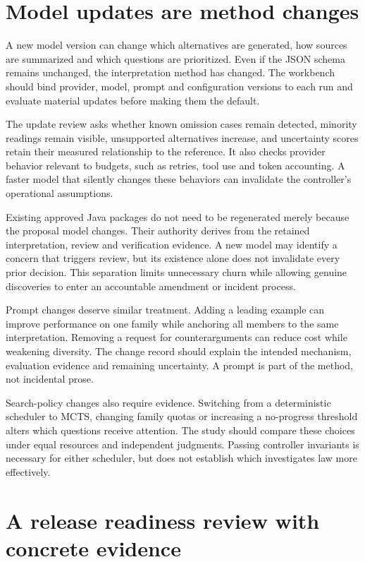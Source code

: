 \documentclass[12pt,a4paper,oneside,openany]{book}
\begin{document}
\section{Model updates are method changes}

A new model version can change which alternatives are generated, how sources are
summarized and which questions are prioritized. Even if the JSON schema remains
unchanged, the interpretation method has changed. The workbench should bind
provider, model, prompt and configuration versions to each run and evaluate
material updates before making them the default.

The update review asks whether known omission cases remain detected, minority
readings remain visible, unsupported alternatives increase, and uncertainty scores
retain their measured relationship to the reference. It also checks provider
behavior relevant to budgets, such as retries, tool use and token accounting.
A faster model that silently changes these behaviors can invalidate the
controller's operational assumptions.

Existing approved Java packages do not need to be regenerated merely because the
proposal model changes. Their authority derives from the retained interpretation,
review and verification evidence. A new model may identify a concern that triggers
review, but its existence alone does not invalidate every prior decision. This
separation limits unnecessary churn while allowing genuine discoveries to enter
an accountable amendment or incident process.

Prompt changes deserve similar treatment. Adding a leading example can improve
performance on one family while anchoring all members to the same interpretation.
Removing a request for counterarguments can reduce cost while weakening diversity.
The change record should explain the intended mechanism, evaluation evidence and
remaining uncertainty. A prompt is part of the method, not incidental prose.

Search-policy changes also require evidence. Switching from a deterministic
scheduler to MCTS, changing family quotas or increasing a no-progress threshold
alters which questions receive attention. The study should compare these choices
under equal resources and independent judgments. Passing controller invariants
is necessary for either scheduler, but does not establish which investigates law
more effectively.

\section{A release readiness review with concrete evidence}
\end{document}
